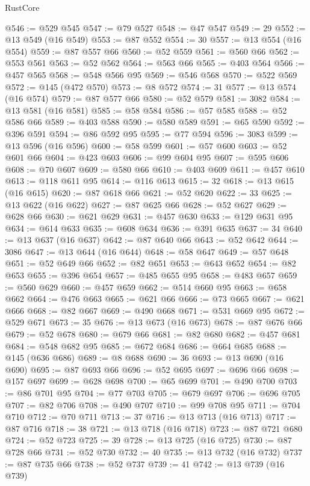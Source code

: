 \begin{lexlean}{RustCore}
\begin{coremodule}
@546 := @529 @545
@547 := @79 @527
@548 := @47 @547
@549 := 29
@552 := @13 @549 (@16 @549)
@553 := @87 @552
@554 := 30
@557 := @13 @554 (@16 @554)
@559 := @87 @557 @66
@560 := @52 @559
@561 := @560 @66
@562 := @553 @561
@563 := @52 @562
@564 := @563 @66
@565 := @403 @564
@566 := @457 @565
@568 := @548 @566 @95
@569 := @546 @568
@570 := @522 @569
@572 := @145 (@472 @570)
@573 := @8 @572
@574 := 31
@577 := @13 @574 (@16 @574)
@579 := @87 @577 @66
@580 := @52 @579
@581 := 3082
@584 := @13 @581 (@16 @581)
@585 := @58 @584
@586 := @57 @585
@588 := @52 @586 @66
@589 := @403 @588
@590 := @580 @589
@591 := @65 @590
@592 := @396 @591
@594 := @86 @592 @95
@595 := @77 @594
@596 := 3083
@599 := @13 @596 (@16 @596)
@600 := @58 @599
@601 := @57 @600
@603 := @52 @601 @66
@604 := @423 @603
@606 := @99 @604 @95
@607 := @595 @606
@608 := @70 @607
@609 := @580 @66
@610 := @403 @609
@611 := @457 @610
@613 := @118 @611 @95
@614 := @116 @613
@615 := 32
@618 := @13 @615 (@16 @615)
@620 := @87 @618 @66
@621 := @52 @620
@622 := 33
@625 := @13 @622 (@16 @622)
@627 := @87 @625 @66
@628 := @52 @627
@629 := @628 @66
@630 := @621 @629
@631 := @457 @630
@633 := @129 @631 @95
@634 := @614 @633
@635 := @608 @634
@636 := @391 @635
@637 := 34
@640 := @13 @637 (@16 @637)
@642 := @87 @640 @66
@643 := @52 @642
@644 := 3086
@647 := @13 @644 (@16 @644)
@648 := @58 @647
@649 := @57 @648
@651 := @52 @649 @66
@652 := @82 @651
@653 := @643 @652
@654 := @82 @653
@655 := @396 @654
@657 := @485 @655 @95
@658 := @483 @657
@659 := @560 @629
@660 := @457 @659
@662 := @514 @660 @95
@663 := @658 @662
@664 := @476 @663
@665 := @621 @66
@666 := @73 @665
@667 := @621 @666
@668 := @82 @667
@669 := @490 @668
@671 := @531 @669 @95
@672 := @529 @671
@673 := 35
@676 := @13 @673 (@16 @673)
@678 := @87 @676 @66
@679 := @52 @678
@680 := @679 @66
@681 := @82 @680
@682 := @457 @681
@684 := @548 @682 @95
@685 := @672 @684
@686 := @664 @685
@688 := @145 (@636 @686)
@689 := @8 @688
@690 := 36
@693 := @13 @690 (@16 @690)
@695 := @87 @693 @66
@696 := @52 @695
@697 := @696 @66
@698 := @157 @697
@699 := @628 @698
@700 := @65 @699
@701 := @490 @700
@703 := @86 @701 @95
@704 := @77 @703
@705 := @679 @697
@706 := @696 @705
@707 := @82 @706
@708 := @490 @707
@710 := @99 @708 @95
@711 := @704 @710
@712 := @70 @711
@713 := 37
@716 := @13 @713 (@16 @713)
@717 := @87 @716
@718 := 38
@721 := @13 @718 (@16 @718)
@723 := @87 @721 @680
@724 := @52 @723
@725 := 39
@728 := @13 @725 (@16 @725)
@730 := @87 @728 @66
@731 := @52 @730
@732 := 40
@735 := @13 @732 (@16 @732)
@737 := @87 @735 @66
@738 := @52 @737
@739 := 41
@742 := @13 @739 (@16 @739)

\end{coremodule}
\end{lexlean}
